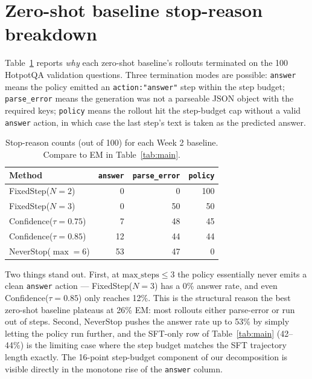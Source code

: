\documentclass[11pt]{article}
\begin{document}
\section{Zero-shot baseline stop-reason breakdown}
\label{app:stop-reasons}

Table~\ref{tab:stop-reasons} reports \emph{why} each zero-shot
baseline's rollouts terminated on the 100 HotpotQA validation
questions. Three termination modes are possible: \texttt{answer}
means the policy emitted an \texttt{action:"answer"} step within
the step budget; \texttt{parse\_error} means the generation was
not a parseable JSON object with the required keys;
\texttt{policy} means the rollout hit the step-budget cap without
a valid \texttt{answer} action, in which case the last step's
text is taken as the predicted answer.

\begin{table}[h]
\small
\centering
\caption{Stop-reason counts (out of 100) for each Week 2
baseline. Compare to EM in Table~\ref{tab:main}.}
\label{tab:stop-reasons}
\begin{tabular}{lrrr}
\toprule
Method & \texttt{answer} & \texttt{parse\_error} & \texttt{policy} \\
\midrule
FixedStep($N{=}2$)         & 0  & 0   & 100 \\
FixedStep($N{=}3$)         & 0  & 50  & 50  \\
Confidence($\tau{=}0.75$)  & 7  & 48  & 45  \\
Confidence($\tau{=}0.85$)  & 12 & 44  & 44  \\
NeverStop($\max{=}6$)      & 53 & 47  & 0   \\
\bottomrule
\end{tabular}
\end{table}

Two things stand out. First, at $\mathrm{max\_steps}\leq 3$ the
policy essentially never emits a clean \texttt{answer} action ---
FixedStep($N{=}3$) has a 0\% answer rate, and even
Confidence($\tau{=}0.85$) only reaches 12\%. This is the
structural reason the best zero-shot baseline plateaus at 26\%
EM: most rollouts either parse-error or run out of steps. Second,
NeverStop pushes the answer rate up to 53\% by simply letting the
policy run further, and the SFT-only row of Table~\ref{tab:main}
(42--44\%) is the limiting case where the step budget matches the
SFT trajectory length exactly. The 16-point step-budget component
of our decomposition is visible directly in the monotone rise of
the \texttt{answer} column.
\end{document}
